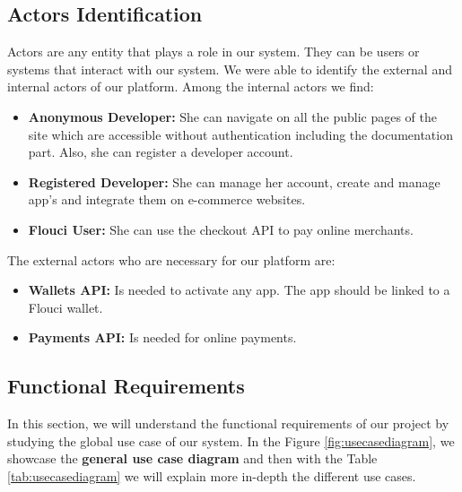 \begin{spacing}{1.2}
\subsection{Actors Identification}
Actors are any entity that plays a role in our system. They can be users or systems that interact with our system. We were able to identify the external and internal actors of our platform. 
\newline
Among the internal actors we find:
\begin{itemize}
  \item \textbf{Anonymous Developer:} She can navigate on all the public pages of the site which are
accessible without authentication including the documentation part. Also, she can register a developer account.
  \item \textbf{Registered Developer:} She can manage her account, create and manage app's and integrate them on e-commerce websites.
  \item \textbf{Flouci User:}  She can use the checkout API to pay online merchants.
\end{itemize}
The external actors who are necessary for our platform are:
\begin{itemize}
  \item \textbf{Wallets API:} Is needed to activate any app. The app should be linked to a Flouci wallet.
  \item \textbf{Payments API:} Is needed for online payments.
\end{itemize}
\subsection{Functional Requirements}
In this section, we will understand the functional requirements of our project by studying the global use case of our system.
	\newline In the Figure \ref{fig:usecasediagram}, we showcase the \textbf{general use case diagram} and then with the Table \ref{tab:usecasediagram} we will explain more in-depth the different use cases.
	

\end{spacing}
